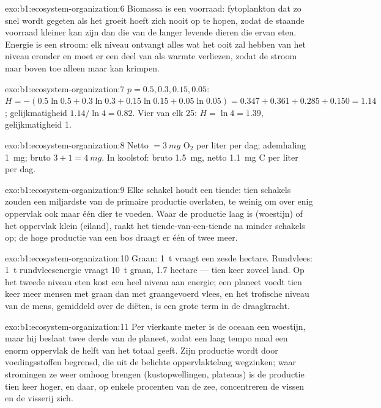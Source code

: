 \begin{solution}{exo:b1:ecosystem-organization:6}
Biomassa is een voorraad: fytoplankton dat zo snel wordt gegeten als het
groeit hoeft zich nooit op te hopen, zodat de staande voorraad 
kleiner kan zijn dan die van de langer levende dieren die ervan eten.
Energie is een stroom: elk niveau ontvangt alles wat het ooit zal hebben van
het niveau eronder en moet er een deel van als warmte verliezen, zodat de
stroom naar boven toe alleen maar kan krimpen.
\end{solution}

\begin{solution}{exo:b1:ecosystem-organization:7}
$p = 0.5, 0.3, 0.15, 0.05$: $H = -(0.5\ln 0.5 + 0.3\ln 0.3 + 0.15\ln
0.15 + 0.05\ln 0.05) = 0.347 + 0.361 + 0.285 + 0.150 = 1.14$;
gelijkmatigheid $1.14/\ln 4 = 0.82$. Vier van elk 25: $H = \ln 4 = 1.39$,
gelijkmatigheid 1.
\end{solution}

\begin{solution}{exo:b1:ecosystem-organization:8}
Netto $= \qty{3}{mg}$ $\mathrm{O_2}$ per liter per dag; ademhaling
\qty{1}{mg}; bruto $3 + 1 = \qty{4}{mg}$. In koolstof: bruto
\qty{1.5}{mg}, netto \qty{1.1}{mg} C per liter per dag.
\end{solution}

\begin{solution}{exo:b1:ecosystem-organization:9}
Elke schakel houdt een tiende: tien schakels zouden een miljardste van de
primaire productie overlaten, te weinig om over enig oppervlak ook maar één
dier te voeden. Waar de productie laag is (woestijn) of het oppervlak klein
(eiland), raakt het tiende-van-een-tiende na minder schakels op; de hoge
productie van een bos draagt er één of twee meer.
\end{solution}

\begin{solution}{exo:b1:ecosystem-organization:10}
Graan: \qty{1}{t} vraagt een zesde hectare. Rundvlees: \qty{1}{t}
rundvleesenergie vraagt \qty{10}{t} graan, \num{1.7} hectare --- tien keer
zoveel land. Op het tweede niveau eten kost een heel niveau aan energie;
een planeet voedt tien keer meer mensen met graan dan met graangevoerd
vlees, en het trofische niveau van de mens, gemiddeld over de diëten, is een
grote term in de draagkracht.
\end{solution}

\begin{solution}{exo:b1:ecosystem-organization:11}
Per vierkante meter is de oceaan een woestijn, maar hij beslaat twee derde
van de planeet, zodat een laag tempo maal een enorm oppervlak de helft van
het totaal geeft. Zijn productie wordt door voedingsstoffen begrensd, die uit
de belichte oppervlaktelaag wegzinken; waar stromingen ze weer omhoog
brengen (kustopwellingen, plateaus) is de productie tien keer hoger, en daar,
op enkele procenten van de zee, concentreren de vissen en de visserij zich.
\end{solution}


